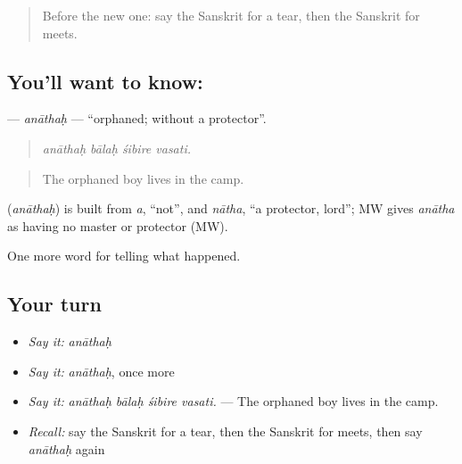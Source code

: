 \label{lesson:SA-C307-anathah}



\begin{quote}
Before the new one: say the Sanskrit for a tear, then the Sanskrit for meets.
\end{quote}

\subsection*{You'll want to know: }
\textbf{} — \emph{anāthaḥ} — \textquotedblleft{}orphaned; without a protector\textquotedblright{}.

\begin{quote}
   
\end{quote}

\begin{quote}
\emph{anāthaḥ bālaḥ śibire vasati.}
\end{quote}

\begin{quote}
The orphaned boy lives in the camp.
\end{quote}

\begin{cousinweb}
\textbf{} (\emph{anāthaḥ}) is built from \emph{a}, \textquotedblleft{}not\textquotedblright{}, and \emph{nātha}, \textquotedblleft{}a protector, lord\textquotedblright{}; MW gives \emph{anātha} as having no master or protector (MW).
\end{cousinweb}

\begin{grammarlens}[title={What you've built}]
One more word for telling what happened.
\end{grammarlens}

\subsection*{Your turn}
\begin{itemize}
\raggedright
  \item \emph{Say it:} \emph{anāthaḥ}
  \item \emph{Say it:} \emph{anāthaḥ}, once more
  \item \emph{Say it:} \emph{anāthaḥ bālaḥ śibire vasati.} — The orphaned boy lives in the camp.
  \item \emph{Recall:} say the Sanskrit for a tear, then the Sanskrit for meets, then say \emph{anāthaḥ} again
\end{itemize}

